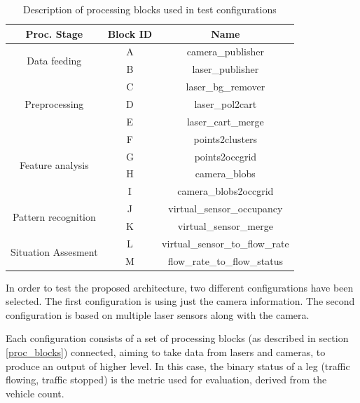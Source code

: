 \begin{table}[ht!]
\footnotesize
\centering
\begin{tabular}{|c | c| c|}
\hline
\textbf{Proc. Stage} & \textbf{Block ID} & \textbf{Name} \\
\hline

\multirow{2}{*}{Data feeding} &
A & camera\_publisher \\
\cline{2-3} 
& B & laser\_publisher \\
\hline

\multirow{3}{*}{Preprocessing} &
C & laser\_bg\_remover \\
\cline{2-3}
& D & laser\_pol2cart \\
\cline{2-3}
& E & laser\_cart\_merge \\
\hline

\multirow{4}{*}{Feature analysis} &
F & points2clusters \\
\cline{2-3}
& G & points2occgrid \\
\cline{2-3}
& H & camera\_blobs \\
\cline{2-3}
& I & camera\_blobs2occgrid \\
\hline

\multirow{2}{*}{Pattern recognition} &
J & virtual\_sensor\_occupancy \\
\cline{2-3}
& K & virtual\_sensor\_merge \\
\hline

\multirow{2}{*}{Situation Assesment} &
L & virtual\_sensor\_to\_flow\_rate \\
\cline{2-3}
& M & flow\_rate\_to\_flow\_status \\
\hline

\end{tabular}
\caption{Description of processing blocks used in test configurations}
\label{desc_test_config}
\end{table}

In order to test the proposed architecture, two different configurations have been selected. The first configuration is using just the camera information. The second configuration is based on multiple laser sensors along with the camera.

Each configuration consists of a set of processing blocks (as described in section \ref{proc_blocks}) connected, aiming to take data from  lasers and cameras, to produce an output of higher level. In this case, the binary status of a leg (traffic flowing, traffic stopped) is the metric used for evaluation, derived from the vehicle count.

